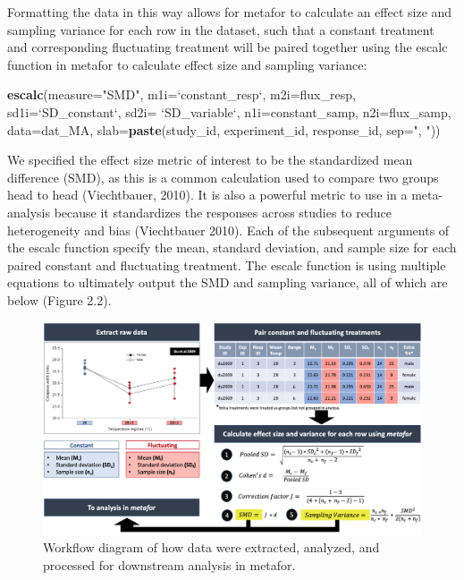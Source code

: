 \documentclass[12pt,twoside]{reedthesis}
\newenvironment{Shaded}{\begin{snugshade}}{\end{snugshade}}
\newcommand{\DataTypeTok}[1]{\textcolor[rgb]{0.13,0.29,0.53}{#1}}
\newcommand{\KeywordTok}[1]{\textcolor[rgb]{0.13,0.29,0.53}{\textbf{#1}}}
\newcommand{\NormalTok}[1]{#1}
\newcommand{\StringTok}[1]{\textcolor[rgb]{0.31,0.60,0.02}{#1}}
\begin{document}
Formatting the data in this way allows for metafor to calculate an effect size and sampling variance for each row in the dataset, such that a constant treatment and corresponding fluctuating treatment will be paired together using the escalc function in metafor to calculate effect size and sampling variance:
\begin{Shaded}
\begin{Highlighting}[]
\KeywordTok{escalc}\NormalTok{(}\DataTypeTok{measure=}\StringTok{"SMD"}\NormalTok{, }\DataTypeTok{m1i=}\StringTok{`}\DataTypeTok{constant_resp}\StringTok{`}\NormalTok{, }\DataTypeTok{m2i=}\NormalTok{flux_resp, }
            \DataTypeTok{sd1i=}\StringTok{`}\DataTypeTok{SD_constant}\StringTok{`}\NormalTok{, }\DataTypeTok{sd2i=} \StringTok{`}\DataTypeTok{SD_variable}\StringTok{`}\NormalTok{, }\DataTypeTok{n1i=}\NormalTok{constant_samp, }
       \DataTypeTok{n2i=}\NormalTok{flux_samp, }\DataTypeTok{data=}\NormalTok{dat_MA, }\DataTypeTok{slab=}\KeywordTok{paste}\NormalTok{(study_id, experiment_id, }
\NormalTok{                                              response_id, }\DataTypeTok{sep=}\StringTok{", "}\NormalTok{))}
\end{Highlighting}
\end{Shaded}
We specified the effect size metric of interest to be the standardized mean difference (SMD), as this is a common calculation used to compare two groups head to head (Viechtbauer, 2010). It is also a powerful metric to use in a meta-analysis because it standardizes the responses across studies to reduce heterogeneity and bias (Viechtbauer 2010). Each of the subsequent arguments of the escalc function specify the mean, standard deviation, and sample size for each paired constant and fluctuating treatment. The escalc function is using multiple equations to ultimately output the SMD and sampling variance, all of which are below (Figure 2.2).
\begin{figure}
\includegraphics[width=1\linewidth]{figures/figure6} \caption[Workflow of analysis in metafor]{Workflow diagram of how data were extracted, analyzed, and processed for downstream analysis in metafor.}\label{fig:unnamed-chunk-12}
\end{figure}
\end{document}
